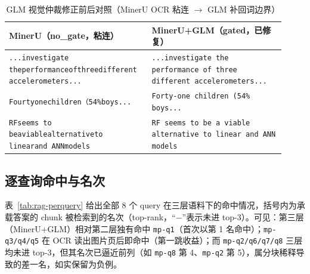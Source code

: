 \documentclass[UTF8,a4paper,11pt]{ctexart}
\begin{document}
\begin{table}[H]
\centering
\caption{GLM 视觉仲裁修正前后对照（MinerU OCR 粘连 $\to$ GLM 补回词边界）}
\label{tab:rag-fix}
\small
\begin{tabular}{p{0.46\linewidth}p{0.46\linewidth}}
\toprule
MinerU（no\_gate，粘连） & MinerU+GLM（gated，已修复） \\
\midrule
\texttt{...investigate theperformanceofthree\-different accelerometers...} & \texttt{...investigate the performance of three different accelerometers...} \\
\texttt{Fourtyonechildren（54\%boys...} & \texttt{Forty-one children (54\% boys...} \\
\texttt{RFseems to beaviablealternativeto linearand ANNmodels} & \texttt{RF seems to be a viable alternative to linear and ANN models} \\
\bottomrule
\end{tabular}
\end{table}

\subsection{逐查询命中与名次}

表~\ref{tab:rag-perquery} 给出全部 8 个 query 在三层语料下的命中情况，括号内为承载答案的 chunk 被检索到的名次（top-rank，``$-$''表示未进 top-3）。可见：第三层（MinerU+GLM）相对第二层独有命中 \texttt{mp-q1}（首次以第 1 名命中）；\texttt{mp-q3/q4/q5} 在 OCR 读出图片页后即命中（第一跳收益）；而 \texttt{mp-q2/q6/q7/q8} 三层均未进 top-3，但其名次已逼近前列（如 \texttt{mp-q8} 第 4、\texttt{mp-q2} 第 5），属分块稀释导致的差一名，如实保留为负例。
\end{document}
